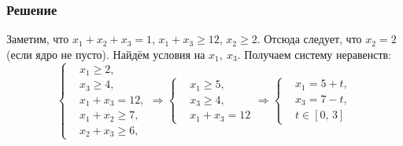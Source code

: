 	\subsubsection*{Решение}
	\label{sec6:sol}
	Заметим, что $x_1+x_2+x_3=1$, $x_1+x_3 \geq 12$, $x_2 \geq 2$. Отсюда следует, что $x_2=2$ (если ядро не пусто). Найдём условия на $x_1,~x_3$. Получаем систему неравенств:
	\[
	\left\{
		\begin{aligned}
			& x_1 \geq 2, \\
			& x_3 \geq 4, \\
			& x_1 + x_3 = 12, \\
			& x_1 + x_2 \geq 7, \\
			& x_2 + x_3 \geq 6,
		\end{aligned}
	\right.
	\Rightarrow
	\left\{
		\begin{aligned}
			& x_1 \geq 5, \\
			& x_3 \geq 4, \\
			& x_1 + x_3 = 12
		\end{aligned}
	\right.
	\Rightarrow
	\left\{
		\begin{aligned}
			& x_1 = 5 + t, \\
			& x_3 = 7 - t, \\
			& t \in [0,\, 3]
		\end{aligned}
	\right.
	\]
